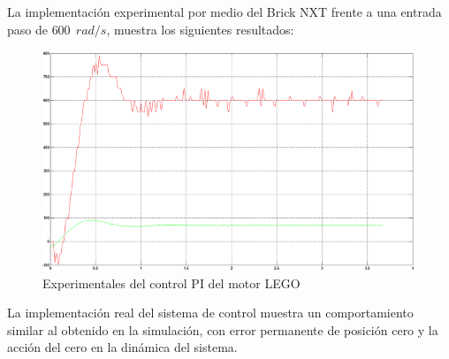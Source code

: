\documentclass[twocolumn]{IEEEtran}
\begin{document}
La implementación experimental por medio del Brick NXT  frente a una entrada paso de $600\ \ rad/s$, muestra los siguientes resultados:
\begin{figure}[H]
	\centering
		\includegraphics[scale=0.35]{salida2.png}
	\caption{Experimentales del control PI del motor LEGO}
	\label{fig6}
\end{figure}
\noindent
La implementación real del sistema de control muestra un comportamiento similar al obtenido en la simulación, con error permanente de posición cero y la acción del cero en la dinámica del sistema. 
\end{document}
